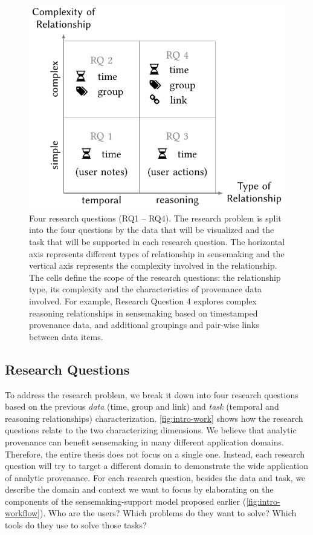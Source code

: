 \begin{figure}[tb]
	\centering
	\includegraphics{work}
	\caption[Four research questions]{Four research questions (RQ1 -- RQ4). The research problem is split into the four questions by the data that will be visualized and the task that will be supported in each research question. The horizontal axis represents different types of relationship in sensemaking and the vertical axis represents the complexity involved in the relationship. The cells define the scope of the research questions: the relationship type, its complexity and the characteristics of provenance data involved. For example, Research Question 4 explores complex reasoning relationships in sensemaking based on timestamped provenance data, and additional groupings and pair-wise links between data items.}
	\label{fig:intro-work}
\end{figure}

\subsection{Research Questions}
\label{intro:questions}
To address the research problem, we break it down into four research questions based on the previous \emph{data} (time, group and link) and \emph{task} (temporal and reasoning relationships) characterization. \autoref{fig:intro-work} shows how the research questions relate to the two characterizing dimensions. We believe that analytic provenance can benefit sensemaking in many different application domains. Therefore, the entire thesis does not focus on a single one. Instead, each research question will try to target a different domain to demonstrate the wide application of analytic provenance. For each research question, besides the data and task, we describe the domain and context we want to focus by elaborating on the components of the sensemaking-support model proposed earlier (\autoref{fig:intro-workflow}). Who are the users? Which problems do they want to solve? Which tools do they use to solve those tasks?

